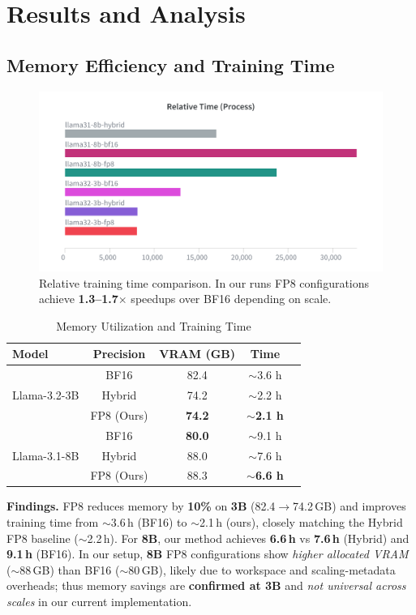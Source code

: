 \documentclass[conference]{IEEEtran}
\begin{document}
\section{Results and Analysis}

\subsection{Memory Efficiency and Training Time}
\begin{figure}[htbp]
    \centering
    \includegraphics[width=1\columnwidth]{training_time.png}
    \caption{Relative training time comparison. In our runs FP8 configurations achieve \textbf{1.3–1.7$\times$} speedups over BF16 depending on scale.}
    \label{fig:training_time}
\end{figure}

\begin{table}[htbp]
\centering
\caption{Memory Utilization and Training Time}
\begin{tabular}{@{}lcccc@{}}
\toprule
\textbf{Model} & \textbf{Precision} & \textbf{VRAM (GB)} & \textbf{Time} \\
\midrule
\multirow{3}{*}{Llama-3.2-3B} & BF16 & 82.4 & $\sim$3.6 h \\
 & Hybrid & 74.2 & $\sim$2.2 h \\
 & FP8 (Ours) & \textbf{74.2} & \textbf{$\sim$2.1 h} \\
\midrule
\multirow{3}{*}{Llama-3.1-8B} & BF16 & \textbf{80.0} & $\sim$9.1 h \\
 & Hybrid & 88.0 & $\sim$7.6 h \\
 & FP8 (Ours) & 88.3 & \textbf{$\sim$6.6 h} \\
\bottomrule
\end{tabular}
\label{tab:memory_scaling}
\end{table}

\noindent\textbf{Findings.} FP8 reduces memory by \textbf{10\%} on \textbf{3B} (82.4$\to$74.2\,GB) and improves training time from $\sim$3.6\,h (BF16) to $\sim$2.1\,h (ours), closely matching the Hybrid FP8 baseline ($\sim$2.2\,h). For \textbf{8B}, our method achieves \textbf{6.6\,h} vs \textbf{7.6\,h} (Hybrid) and \textbf{9.1\,h} (BF16). In our setup, \textbf{8B} FP8 configurations show \emph{higher allocated VRAM} ($\sim$88\,GB) than BF16 ($\sim$80\,GB), likely due to workspace and scaling-metadata overheads; thus memory savings are \textbf{confirmed at 3B} and \emph{not universal across scales} in our current implementation.
\end{document}
